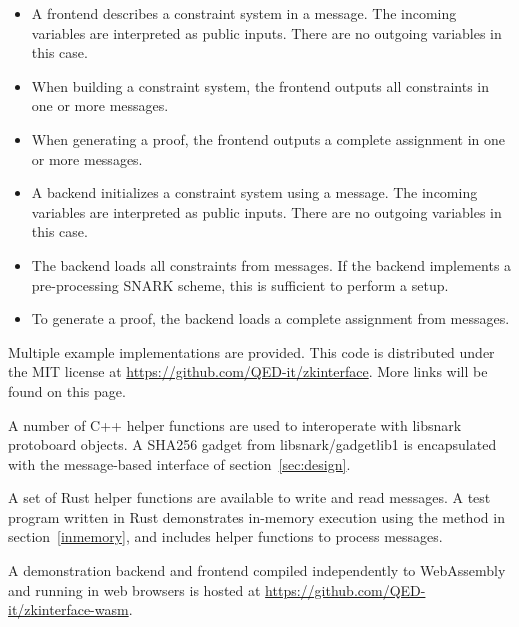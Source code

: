 \begin{itemize}
    \item A frontend describes a constraint system in a  message. The incoming variables are interpreted as public inputs. There are no outgoing variables in this case.

    \item When building a constraint system, the frontend outputs all constraints in one or more  messages.

    \item When generating a proof, the frontend outputs a complete assignment in one or more  messages.
\end{itemize}


\begin{itemize}
    \item A backend initializes a constraint system using a  message. The incoming variables are interpreted as public inputs. There are no outgoing variables in this case.

    \item The backend loads all constraints from  messages. If the backend implements a pre-processing SNARK scheme, this is sufficient to perform a setup.

    \item To generate a proof, the backend loads a complete assignment from  messages.
\end{itemize}



Multiple example implementations are provided.
This code is distributed under the MIT license at
\href{https://github.com/QED-it/zkinterface}{https://github.com/QED-it/zkinterface}.
More links will be found on this page.

A number of C++ helper functions are used to interoperate
with libsnark protoboard objects.
A SHA256 gadget from libsnark/gadgetlib1
is encapsulated with the message-based interface of section~\ref{sec:design}.

A set of Rust helper functions are available to write and read messages.
A test program written in Rust demonstrates
in-memory execution using the method in section~\ref{inmemory},
and includes helper functions to process messages.

A demonstration backend and frontend compiled independently to WebAssembly and running in web browsers is hosted at
\href{https://github.com/QED-it/zkinterface-wasm}{https://github.com/QED-it/zkinterface-wasm}.

